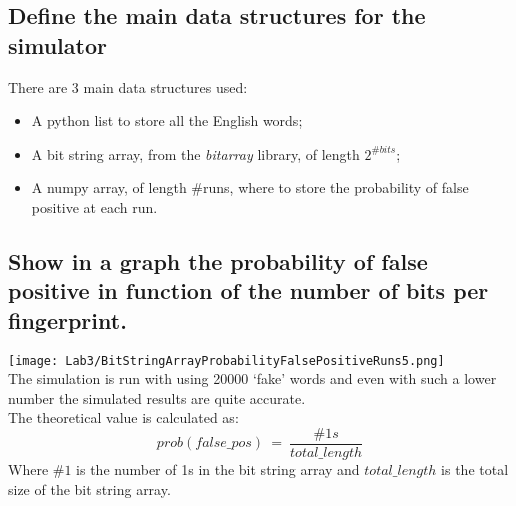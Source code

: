 \documentclass{report}
\begin{document}
{			\subsection{Define the main data structures for the simulator}
						There are 3 main data structures used: 
							\begin{itemize}
								\item A python list to store all the English words;
								\item A bit string array,  from the \emph{bitarray} library, of length $2^{\#bits}$;
								\item A numpy array, of length \#runs, where to store the probability of false positive at each run.
							\end{itemize}
					
			\subsection{Show in a graph the probability of false positive in function of the number of bits per fingerprint.}
			\texttt{[image: Lab3/BitStringArrayProbabilityFalsePositiveRuns5.png]} \\
			The simulation is run with using 20000 `fake' words and even with such a lower number the simulated results are quite accurate. \\
			The theoretical value is calculated as:
			\begin{equation}\label{eq:1}
						prob(false\_pos) \: = \: \frac{\#1s}{total\_length}
			\end{equation}
			Where $\#1$ is the number of 1s in the bit string array and $total\_length$ is the total size of the bit string array.
			
			
			
}
\end{document}
